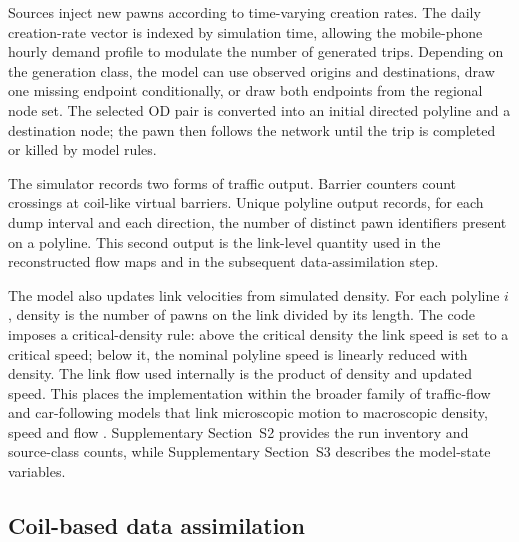 \documentclass[pdflatex,Numbered]{sn-jnl}
\begin{document}
Sources inject new pawns according to time-varying creation rates. The daily creation-rate vector is indexed by simulation time, allowing the mobile-phone hourly demand profile to modulate the number of generated trips. Depending on the generation class, the model can use observed origins and destinations, draw one missing endpoint conditionally, or draw both endpoints from the regional node set. The selected OD pair is converted into an initial directed polyline and a destination node; the pawn then follows the network until the trip is completed or killed by model rules.

The simulator records two forms of traffic output. Barrier counters count crossings at coil-like virtual barriers. Unique polyline output records, for each dump interval and each direction, the number of distinct pawn identifiers present on a polyline. This second output is the link-level quantity used in the reconstructed flow maps and in the subsequent data-assimilation step.

The model also updates link velocities from simulated density. For each polyline $i$, density is the number of pawns on the link divided by its length. The code imposes a critical-density rule: above the critical density the link speed is set to a critical speed; below it, the nominal polyline speed is linearly reduced with density. The link flow used internally is the product of density and updated speed. This places the implementation within the broader family of traffic-flow and car-following models that link microscopic motion to macroscopic density, speed and flow
\cite{nagel1992,bando1995,helbing1998,jiang2001,bham2004,helbing2001,brackstone1999,newell2002,treiber2013}.
Supplementary Section~S2 provides the run inventory and source-class counts, while Supplementary Section~S3 describes the model-state variables.

\subsection{Coil-based data assimilation}
\end{document}
